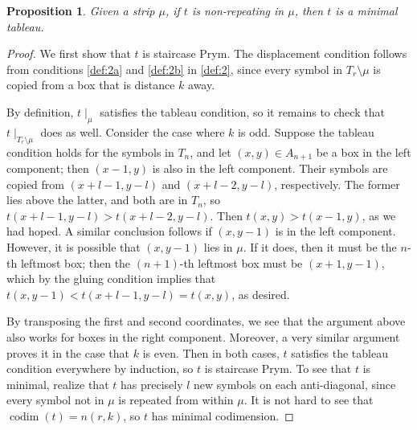 \documentclass[11pt,reqno]{amsart}
\newcommand*{\restrict}[1]{{\mid}_{#1}}
\DeclareMathOperator{\codim}{codim}
\theoremstyle{definition}
\theoremstyle{problem}
\theoremstyle{plain}
\newtheorem{proposition}[definition]{Proposition}
\theoremstyle{remark}
\theoremstyle{theorem}
\numberwithin{equation}{section}
\numberwithin{figure}{section}
\theoremstyle{definition}
\theoremstyle{problem}
\theoremstyle{plain}
\begin{document}
\begin{proposition}\label{prop:18}
  Given a strip $\mu$, if $t$ is non-repeating in $\mu$, then $t$ is a
  minimal tableau.
\end{proposition}

\begin{proof}
  We first show that $t$ is staircase Prym.  The displacement
  condition  follows from conditions
  \ref{def:2a} and \ref{def:2b} in 
  \cref{def:2}, since every symbol in $T_r \setminus \mu$ is copied
  from a box that is distance $k$ away.

  By definition, $t\restrict\mu$ satisfies the tableau condition, so
  it remains to check that $t\restrict{T_r \setminus \mu}$ does as
  well.  Consider the case where $k$ is odd.  Suppose the tableau
  condition holds for the symbols in $T_n$, and let
  $(x,y) \in A_{n+1}$ be a box in the left component; then $(x-1,y)$
  is also in the left component.  Their symbols are copied from
  $(x+l-1,y-l)$ and $(x+l-2,y-l)$, respectively.  The former lies
  above the latter, and both are in $T_n$, so
  $t(x+l-1,y-l) > t(x+l-2,y-l)$.  Then $t(x,y) > t(x-1,y)$, as we had
  hoped.  A similar conclusion follows if $(x,y-1)$ is in the left
  component.  However, it is possible that $(x,y-1)$ lies in $\mu$.
  If it does, then it must be the $n$-th leftmost box; then the
  $(n+1)$-th leftmost box must be $(x+1,y-1)$, which by the gluing
  condition implies that $t(x,y-1) < t(x+l-1,y-l) = t(x,y)$, as
  desired.

  By transposing the first and second coordinates, we see that the
  argument above also works for boxes in the right component.
  Moreover, a very similar argument proves it in the case that $k$ is
  even.  Then in both cases, $t$ satisfies the tableau condition
  everywhere by induction, so $t$ is staircase Prym.  To see that $t$
  is minimal, realize that $t$ has precisely $l$ new symbols on each
  anti-diagonal, since every symbol not in $\mu$ is repeated from
  within $\mu$.  It is not hard to see that $\codim(t) = n(r,k)$, so
  $t$ has minimal codimension.
\end{proof}
\end{document}
